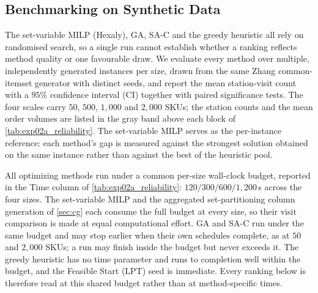 \documentclass[preprint,review,11pt,authoryear]{elsarticle}
\begin{document}
\subsection{Benchmarking on Synthetic Data}\label{sec:reliability_multiseed}
The set-variable MILP (Hexaly), GA, SA-C and the greedy heuristic all rely on randomised search, so a single run cannot establish whether a ranking reflects method quality or one favourable draw. We evaluate every method over multiple, independently generated instances per size, drawn from the same Zhang common-itemset generator with distinct seeds, and report the mean station-visit count with a $95\%$ confidence interval (CI) together with paired significance tests. The four scales carry $50$, $500$, $1{,}000$ and $2{,}000$ SKUs; the station counts and the mean order volumes are listed in the gray band above each block of \cref{tab:exp02a_reliability}. The set-variable MILP serves as the per-instance reference: each method's gap is measured against the strongest solution obtained on the same instance rather than against the best of the heuristic pool.

All optimizing methods run under a common per-size wall-clock budget, reported in the Time column of \cref{tab:exp02a_reliability}: $120/300/600/1{,}200$\,s across the four sizes. The set-variable MILP and the aggregated set-partitioning column generation of \cref{sec:cg} each consume the full budget at every size, so their visit comparison is made at equal computational effort. GA and SA-C run under the same budget and may stop earlier when their own schedules complete, as at $50$ and $2{,}000$ SKUs; a run may finish inside the budget but never exceeds it. The greedy heuristic has no time parameter and runs to completion well within the budget, and the Feasible Start (LPT) seed is immediate. Every ranking below is therefore read at this shared budget rather than at method-specific times.
\end{document}
